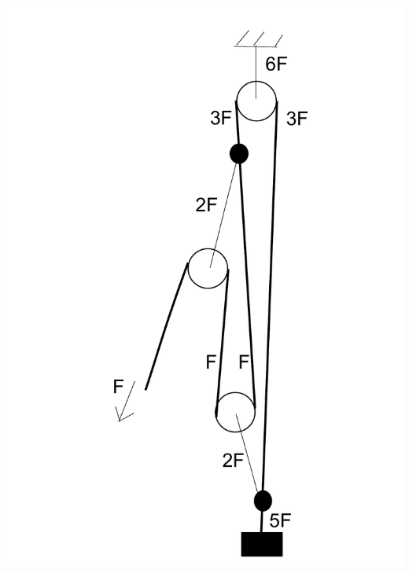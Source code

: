 \documentclass[11pt]{article}
\begin{document}
\begin{center}
\includegraphics[scale=0.25]{2014-v3g-06-PolyspastL1}

\end{center}
\end{document}
